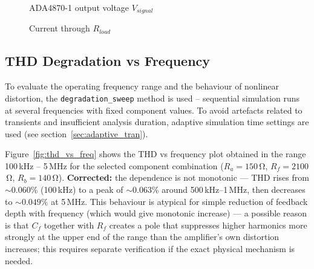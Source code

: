 \documentclass[a4paper, 12pt]{article}
\begin{document}
\begin{figure}[H]
\centering
{}
\caption{ADA4870-1 output voltage \(V_{signal}\)}
\end{figure}

\begin{figure}[H]
\centering
{}
\caption{Current through \(R_{load}\)}
\end{figure}

\subsection{THD Degradation vs Frequency}
\label{sec:degradation}

To evaluate the operating frequency range and the behaviour of nonlinear
distortion, the \texttt{degradation\_sweep} method is used – sequential
simulation runs at several frequencies with fixed component values. To avoid
artefacts related to transients and insufficient analysis duration, adaptive
simulation time settings are used (see section~\ref{sec:adaptive_tran}).

Figure~\ref{fig:thd_vs_freq} shows the THD vs frequency plot obtained in the
range 100\,kHz – 5\,MHz for the selected component combination (\(R_a=150\)\,Ω,
\(R_f=2100\)\,Ω, \(R_b=140\)\,Ω). \textbf{Corrected:} the dependence is not
monotonic — THD rises from \(\sim 0.060\%\) (100\,kHz) to a peak of
\(\sim 0.063\%\) around 500\,kHz–1\,MHz, then decreases to \(\sim 0.049\%\) at
5\,MHz. This behaviour is atypical for simple reduction of feedback depth with
frequency (which would give monotonic increase) — a possible reason is that
\(C_f\) together with \(R_f\) creates a pole that suppresses higher harmonics
more strongly at the upper end of the range than the amplifier's own distortion
increases; this requires separate verification if the exact physical mechanism
is needed.
\end{document}
